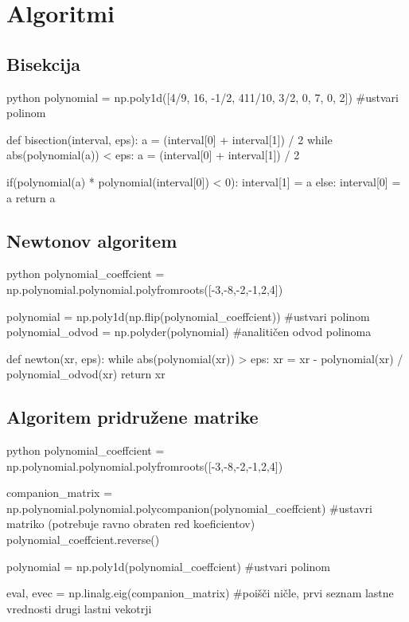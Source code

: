\appendix

\chapter{Algoritmi}
\section{Bisekcija}
\begin{mintedbox}{python}
polynomial = np.poly1d([4/9, 16, -1/2, 411/10, 3/2, 0, 7, 0, 2]) #ustvari polinom

def bisection(interval, eps):
    a = (interval[0] + interval[1]) / 2
    while abs(polynomial(a)) < eps:
        a = (interval[0] + interval[1]) / 2
        
        if(polynomial(a) * polynomial(interval[0]) < 0):
            interval[1] = a
        else:
            interval[0] = a
    return a

\end{mintedbox}

\section{Newtonov algoritem}

\begin{mintedbox}{python}
polynomial_coeffcient = np.polynomial.polynomial.polyfromroots([-3,-8,-2,-1,2,4])


polynomial = np.poly1d(np.flip(polynomial_coeffcient)) #ustvari polinom
polynomial_odvod = np.polyder(polynomial) #analitičen odvod polinoma

def newton(xr, eps):
    while abs(polynomial(xr)) > eps:
        xr = xr - polynomial(xr) / polynomial_odvod(xr)
    return xr
\end{mintedbox}
\section*{Algoritem pridružene matrike}

\begin{mintedbox}{python}
polynomial_coeffcient = np.polynomial.polynomial.polyfromroots([-3,-8,-2,-1,2,4])

companion_matrix = np.polynomial.polynomial.polycompanion(polynomial_coeffcient) #ustavri matriko (potrebuje ravno obraten red koeficientov)
polynomial_coeffcient.reverse()

polynomial = np.poly1d(polynomial_coeffcient) #ustvari polinom


eval, evec = np.linalg.eig(companion_matrix) #poišči ničle, prvi seznam lastne vrednosti drugi lastni vekotrji
\end{mintedbox}

